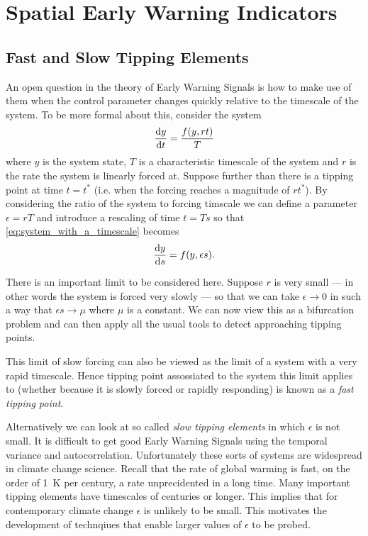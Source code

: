 \chapter{Spatial Early Warning Indicators}
\graphicspath{{spatial_ews/figs/}}

\section{Fast and Slow Tipping Elements}
An open question in the theory of Early Warning Signals is how to make use of them when the control parameter
changes quickly relative to the timescale of the system\cite{VanderBolt2021}.
To be more formal about this, consider the system
\begin{equation}
  \label{eq:system_with_a_timescale}
  \dv{y}{t} = \frac{f(y,rt)}{T}
\end{equation}
where $y$ is the system state, $T$ is a characteristic timescale of the system and $r$ is the rate the system is linearly forced
at. Suppose further than there is a tipping point at time $t = t^*$ (i.e. when the forcing reaches a magnitude of $rt^*$). By considering
the ratio of the system to forcing timscale we can define a parameter $\epsilon = rT$ and introduce a rescaling of time $t=Ts$
so that \cref{eq:system_with_a_timescale} becomes
\begin{equation}
  \label{eq:system_with_a_timescale_rescaled}
  \dv{y}{s} = f(y,\epsilon s).
\end{equation}

There is an important limit to be considered here. Suppose $r$ is very small --- in other words the system is forced very slowly --- so that we
can take $\epsilon\rightarrow 0$ in such a way that $\epsilon s \rightarrow \mu$ where $\mu$ is a constant. We can now view this as a bifurcation
problem and can then apply all the usual tools to detect approaching tipping points\cite{scheffer2009}.

This limit of slow forcing can also be viewed as the limit of a system with a very rapid timescale. Hence tipping point assossiated to the system
this limit applies to (whether because it is slowly forced or rapidly responding) is known as a \emph{fast tipping point}.

Alternatively we can look at so called \emph{slow tipping elements} in which $\epsilon$ is not small. It is difficult to get good Early Warning Signals
using the temporal variance and autocorrelation\cite{VanderBolt2021}. Unfortunately these sorts of systems are widespread in climate change science.
Recall that the rate of global warming is fast, on the order of \SI{1}{\kelvin} per century\cite{Osborn2021}, a rate unprecidented in
a long time. Many important tipping elements have timescales of centuries or longer.
This implies that for contemporary climate change $\epsilon$ is unlikely to be small. This motivates the development of technqiues that enable
larger values of $\epsilon$ to be probed.

